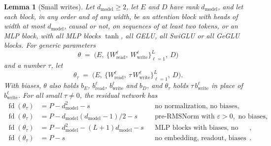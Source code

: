 \documentclass[10pt]{article}
\newtheorem{lemma}[theorem]{Lemma}
\theoremstyle{definition}
\theoremstyle{remark}
\newcommand{\Wread}{W_{\mathrm{read}}}
\newcommand{\Wwrite}{W_{\mathrm{write}}}
\newcommand{\dm}{d_{\mathrm{model}}}
\begin{document}
\begin{lemma}[Small writes]\label{lem:smallwrites}
Let $\dm \ge 2$, let $E$ and $D$ have rank $\dm$, and let each block, in any order and of any width, be an attention block with heads of width at most $\dm$, causal or not, on sequences of at least two tokens, or an MLP block, with all MLP blocks $\tanh$, all GELU, all SwiGLU or all GeGLU blocks. For generic parameters
\[
\theta \;=\; \Big(E,\ \big\{\Wread^{\ell},\ \Wwrite^{\ell}\big\}_{\ell=1}^{L},\ D\Big)
\]
and a number $\tau$, let
\[
\theta_\tau \;=\; \Big(E,\ \big\{\Wread^{\ell},\ \tau\,\Wwrite^{\ell}\big\}_{\ell=1}^{L},\ D\Big).
\]
With biases, $\theta$ also holds $b_E$, $b^{\ell}_{\mathrm{read}}$, $b^{\ell}_{\mathrm{write}}$ and $b_D$, and $\theta_\tau$ holds $\tau\,b^{\ell}_{\mathrm{write}}$ in place of $b^{\ell}_{\mathrm{write}}$. For all small $\tau \neq 0$, the residual network has
\begin{align*}
\operatorname{fd}(\theta_\tau) &= P - \dm^2 - s && \text{no normalization, no biases},\\
\operatorname{fd}(\theta_\tau) &= P - \dm(\dm-1)/2 - s && \text{pre-RMSNorm with } \varepsilon > 0, \text{ no biases},\\
\operatorname{fd}(\theta_\tau) &= P - \dm^2 - (L+1)\dm - s && \text{MLP blocks with biases, no normalization},\\
\operatorname{fd}(\theta_\tau) &= P - s && \text{no embedding, readout, biases or normalization}.
\end{align*}
\end{lemma}
\end{document}
